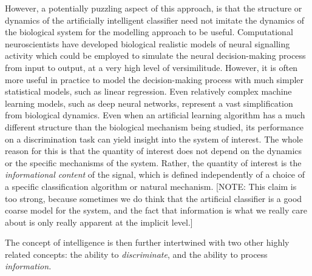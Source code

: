However, a potentially puzzling aspect of this approach, is that the
structure or dynamics of the artificially intelligent classifier need
not imitate the dynamics of the biological system for the modelling
approach to be useful.  Computational neuroscientists have developed
biological realistic models of neural signalling activity which could
be employed to simulate the neural decision-making process from input
to output, at a very high level of versimilitude.  However, it is
often more useful in practice to model the decision-making process
with much simpler statistical models, such as linear regression.  Even
relatively complex machine learning models, such as deep neural
networks, represent a vast simplification from biological dynamics.
Even when an artificial learning algorithm has a much different
structure than the biological mechanism being studied, its performance
on a discrimination task can yield insight into the system of
interest.  The whole reason for this is that the quantity of interest
does not depend on the dynamics or the specific mechanisms of the
system.  Rather, the quantity of interest is the \emph{informational
  content} of the signal, which is defined independently of a choice
of a specific classification algorithm or natural mechanism.  [NOTE:
  This claim is too strong, because sometimes we do think that the
  artificial classifier is a good coarse model for the system, and the
  fact that information is what we really care about is only really
  apparent at the implicit level.]



The concept of intelligence is then further intertwined with two other
highly related concepts: the ability to \emph{discriminate}, and the
ability to process \emph{information.}




